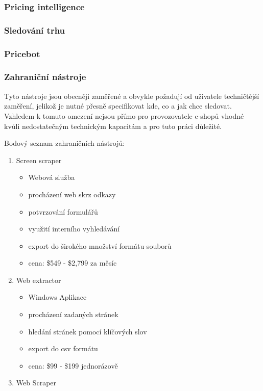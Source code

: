 \documentclass[thesis=B,czech]{FITthesis}[2012/06/26]
\begin{document}
\subsubsection{Pricing intelligence}

\subsubsection{Sledování trhu}

\subsubsection{Pricebot}

\newpage

\subsubsection{Zahraniční nástroje}
Tyto nástroje jsou obecněji zaměřené a obvykle požadují od uživatele techničtější zaměření, 
jelikož je nutné přesně specifikovat kde, co a jak chce sledovat. Vzhledem k tomuto omezení
nejsou přímo pro provozovatele e-shopů vhodné kvůli nedostatečným technickým kapacitám a 
pro tuto práci důležité.
\par
Bodový seznam zahraničních nástrojů:

\begin{enumerate}
\item Screen scraper \cite{ScreenScraper}

  \begin{itemize}
    \item Webová služba
    \item procházení web skrz odkazy
    \item potvrzování formulářů
    \item využití interního vyhledávání
    \item export do širokého množství formátu souborů
    \item cena: \$549 - \$2,799 za měsíc
  \end{itemize}
  
\item Web extractor \cite{WebExtractor}

  \begin{itemize}
    \item Windows Aplikace
    \item procházení zadaných stránek
    \item hledání stránek pomocí klíčových slov
    \item export do csv formátu
    \item cena: \$99 - \$199 jednorázově
  \end{itemize}

\item Web Scraper \cite{WebScraper}

\end{enumerate}
\end{document}
